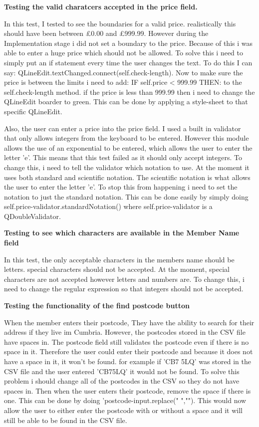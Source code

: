 \textbf{Testing the valid charatcers accepted in the price field.}

In this test, I tested to see the boundaries for a valid price. realistically this should have been between £0.00 and £999.99. However during the Implementation stage i did not set a boundary to the price. Because of this i was able to enter a huge price which should not be allowed. To solve this i need to simply put an if statement every time the user changes the text. To do this I can say: QLineEdit.textChanged.connect(self.check-length). Now to make sure the price is between the limits i need to add: IF self.price < 999.99 THEN: to the self.check-length method. if the price is less than 999.99 then i need to change the QLineEdit boarder to green. This can be done by applying a style-sheet to that specific QLineEdit.

Also, the user can enter a price into the price field. I used a built in validator that only allows integers from the keyboard to be entered. However this module allows the use of an exponential to be entered, which allows the user to enter the letter 'e'. This means that this test failed as it should only accept integers. To change this, i need to tell the validator which notation to use. At the moment it uses both standard and scientific notation. The scientific notation is what allows the user to enter the letter 'e'. To stop this from happening i need to set the notation to just the standard notation. This can be done easily by simply doing self.price-validator.standardNotation() where self.price-validator is a QDoubleValidator.

\textbf{Testing to see which characters are available in the Member Name field}

In this test, the only acceptable characters in the members name should be letters. special characters should not be accepted. At the moment, special characters are not accepted however letters and numbers are. To change this, i need to change the regular expression so that integers should not be accepted.

\textbf{Testing the functionality of the find postcode button}

When the member enters their postcode, They have the ability to search for their address if they live im Cumbria. However, the postcodes stored in the CSV file have spaces in. The postcode field still validates the postcode even if there is no space in it. Therefore the user could enter their postcode and because it does not have a space in it, it won't be found. for example if 'CB7 5LQ' was stored in the CSV file and the user entered 'CB75LQ' it would not be found. To solve this problem i should change all of the postcodes in the CSV so they do not have spaces in. Then when the user enters their postcode, remove the space if there is one. This can be done by doing 'postcode-input.replace(" ",""). This would now allow the user to either enter the postcode with or without a space and it will still be able to be found in the CSV file.

